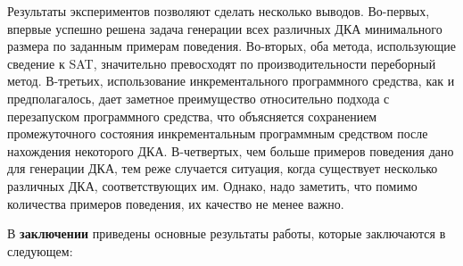 Результаты экспериментов позволяют сделать несколько выводов.
Во-первых, впервые успешно решена задача генерации всех различных ДКА минимального размера по заданным примерам поведения.
Во-вторых, оба метода, использующие сведение к SAT, значительно превосходят по производительности переборный метод.
В-третьих, использование инкрементального программного средства, как и предполагалось, дает заметное преимущество относительно подхода с перезапуском программного средства, что объясняется сохранением промежуточного состояния инкрементальным программным средством после нахождения некоторого ДКА.
В-четвертых, чем больше примеров поведения дано для генерации ДКА, тем реже случается ситуация, когда существует несколько различных ДКА, соответствующих им.
Однако, надо заметить, что помимо количества примеров поведения, их качество не менее важно.



В \textbf{заключении} приведены основные результаты работы, которые заключаются в следующем:

